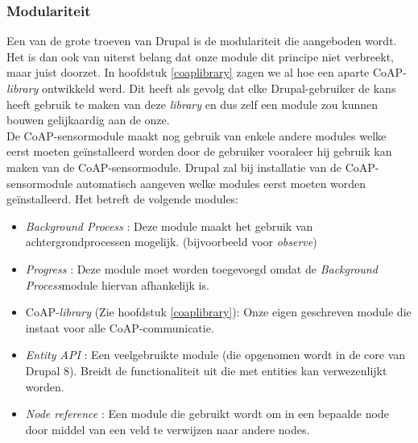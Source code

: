 \subsubsection{Modulariteit}
Een van de grote troeven van Drupal is de modulariteit die aangeboden wordt. Het is dan ook van uiterst belang dat onze module dit principe niet verbreekt, maar juist doorzet. In hoofdstuk \ref{coaplibrary} zagen we al hoe een aparte CoAP-\textit{library} ontwikkeld werd. Dit heeft als gevolg dat elke Drupal-gebruiker de kans heeft gebruik te maken van deze \textit{library} en dus zelf een module zou kunnen bouwen gelijkaardig aan de onze.\\
De CoAP-sensormodule maakt nog gebruik van enkele andere modules welke eerst moeten ge\"{i}nstalleerd worden door de gebruiker vooraleer hij gebruik kan maken van de CoAP-sensormodule. Drupal zal bij installatie van de CoAP-sensormodule automatisch aangeven welke modules eerst moeten worden ge\"{i}nstalleerd. Het betreft de volgende modules:
\begin{itemize}
\item \textit{Background Process} \cite{backgroundProcessModule}: Deze module maakt het gebruik van achtergrondprocessen mogelijk. (bijvoorbeeld voor \textit{observe})
\item \textit{Progress} \cite{progressModule}: Deze module moet worden toegevoegd omdat de \textit{Background Process}module hiervan afhankelijk is.
\item CoAP-\textit{library} (Zie hoofdstuk \ref{coaplibrary}): Onze eigen geschreven module die instaat voor alle CoAP-communicatie.
\item \textit{Entity API} \cite{entityApiModule}: Een veelgebruikte module (die opgenomen wordt in de core van Drupal 8). Breidt de functionaliteit uit die met entities kan verwezenlijkt worden.
\item \textit{Node reference} \cite{nodeReferenceModule}: Een module die gebruikt wordt om in een bepaalde node door middel van een veld te verwijzen naar andere nodes.
\end{itemize}


